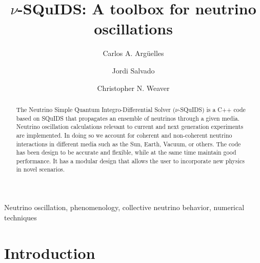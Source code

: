 \documentclass[3p,12pt]{elsarticle}
\begin{document}
\begin{frontmatter}

\title{$\nu$-SQuIDS: A toolbox for neutrino oscillations}

\author[MIT]{Carlos A. Arg\"uelles}
\author[UB]{Jordi Salvado}
\author[UA]{Christopher N. Weaver}
\address[MIT]{Massachusetts Institute of Technology, Cambridge, MA 02139, USA}
\address[UA]{Dept.~of Physics, University of Alberta, Edmonton,
  Alberta, Canada T6G 2E1} 
\address[UB]{Departament de F\'isica Qu\`antica i Astrofísica and Institut de Ciencies del Cosmos,
Universitat de Barcelona, Diagonal 647, E-08028 Barcelona, Spain}


\begin{abstract}
The Neutrino Simple Quantum Integro-Differential Solver ($\nu$-SQuIDS)
is a C++ code based on SQuIDS that propagates an ensemble of neutrinos
through a given media. Neutrino oscillation calculations relevant to
current and next generation experiments are implemented. In doing so
we account for coherent and non-coherent neutrino interactions in
different media such as the Sun, Earth, Vacuum, or others.
The code has been design to be accurate and flexible, while at the
same time maintain good performance. It has a modular design that
allows the user to incorporate new physics in novel scenarios. 
\end{abstract}

\begin{keyword}
Neutrino oscillation, phenomenology, collective neutrino behavior, numerical techniques
\end{keyword}

\end{frontmatter}

\hypersetup{linkcolor=black}
\tableofcontents
\hypersetup{linkcolor=blue}
\newpage
\section{Introduction}
\label{sec:intro} 
\end{document}
